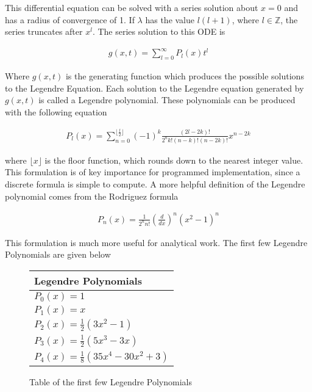         \noindent This differential equation can be solved with a series solution about $x = 0$ and has a radius of convergence of 1. If $\lambda$ has the value $l(l+1)$, where $l \in \mathbb{Z}$, the series truncates after $x^{l}$. The series solution to this ODE is 

        \begin{align}
            g(x, t) = \sum_{l = 0}^\infty P_l(x) t^l 
        \end{align}

        \noindent Where $g(x, t)$ is the generating function which produces the possible solutions to the Legendre Equation. Each solution to the Legendre equation generated by $g(x, t)$ is called a Legendre polynomial. These polynomials can be produced with the following equation

        \begin{align}
            P_l(x) = \sum_{n = 0}^{\lfloor \frac{l}{2} \rfloor} (-1)^k \frac{(2l - 2k)!}{2^n k! (n - k)!(n - 2k)!}x^{n-2k}
        \end{align}

        \noindent where $\lfloor x \rfloor$ is the floor function, which rounds down to the nearest integer value. This formulation is of key importance for programmed implementation, since a discrete formula is simple to compute. A more helpful definition of the Legendre polynomial comes from the Rodriguez formula \cite{Arfken_Weber_Arfken_Weber_2008}

        \begin{align}
            P_n(x) = \frac{1}{2^n n!} \left( \frac{d}{dx} \right)^n (x^2 - 1)^n
        \end{align}

        \noindent This formulation is much more useful for analytical work. The first few Legendre Polynomials are given below

        \begin{figure}
            \centering
            \begin{tabular}{l}
                Legendre Polynomials\\
                \hline
                $P_0(x) = 1$\\
                $P_1(x) = x$\\
                $P_2(x) = \frac{1}{2}\left(3x^2 - 1\right)$\\
                $P_3(x) = \frac{1}{2} \left(5x^3 - 3x\right)$ \\
                $P_4(x) = \frac{1}{8} \left(35x^4 - 30x^2 + 3 \right)$\\
                \hline
            \end{tabular}
            \caption{Table of the first few Legendre Polynomials}
            \label{tab:Legendre_Polynomials}
        \end{figure}

